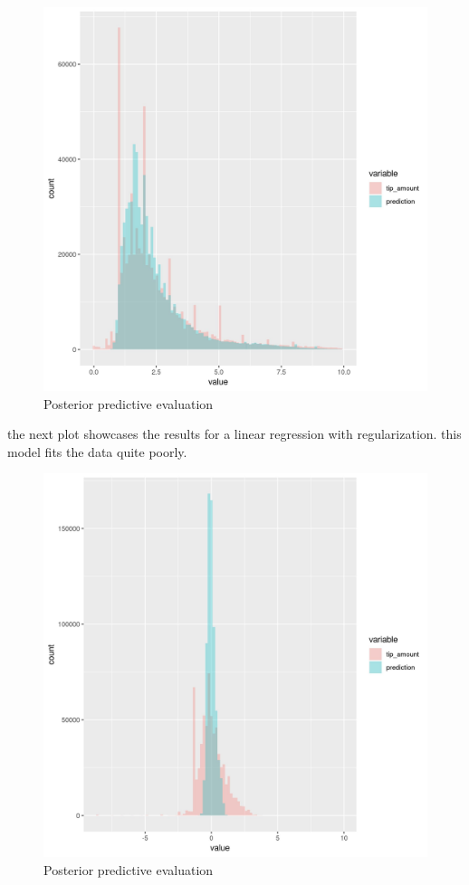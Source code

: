 \documentclass[11pt]{article}
\begin{document}
\begin{figure}[htbp]
\centering
\includegraphics[width=.9\linewidth]{./plots/evaluation2PosteriorPredictive.jpg}
\caption{\label{fig:org0c33e25}
Posterior predictive evaluation}
\end{figure}

the next plot showcases the results for a linear regression with
regularization. this model fits the data quite poorly.

\begin{figure}[htbp]
\centering
\includegraphics[width=.9\linewidth]{./plots/evaluation3PosteriorPredictive.jpg}
\caption{\label{fig:orgff972ec}
Posterior predictive evaluation}
\end{figure}
\end{document}
